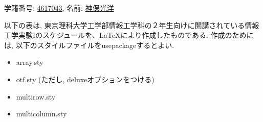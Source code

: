 \documentclass[a4paper, 12pt]{jarticle}
\begin{document}
\begin{center}
学籍番号: \underline{4617043},
名前: \underline{神保光洋}
\end{center}

以下の表は, 東京理科大学工学部情報工学科の２年生向けに開講されている情報工学実験Iのスケジュールを、\LaTeX により作成したものである. 作成のためには, 以下のスタイルファイルをusepackageするとよい.

\begin{itemize}
    \item array.sty
    \item otf.sty (ただし, deluxeオプションをつける)
    \item multirow.sty
    \item multicolumn.sty
\end{itemize}
\end{document}
